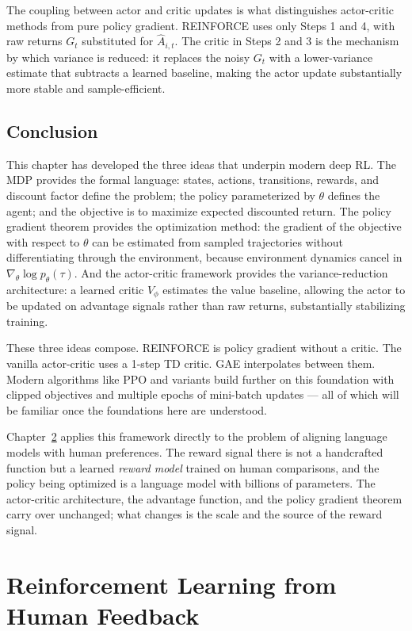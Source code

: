 \documentclass{book}
\begin{document}
The coupling between actor and critic updates is what distinguishes
actor-critic methods from pure policy gradient. REINFORCE uses only Steps
1 and 4, with raw returns $G_t$ substituted for $\hat{A}_{i,t}$. The
critic in Steps 2 and 3 is the mechanism by which variance is reduced:
it replaces the noisy $G_t$ with a lower-variance estimate that
subtracts a learned baseline, making the actor update substantially more
stable and sample-efficient.

\section{Conclusion}
\label{sec:rl_conclusion}

This chapter has developed the three ideas that underpin modern deep RL.
The MDP provides the formal language: states, actions, transitions, rewards,
and discount factor define the problem; the policy parameterized by $\theta$
defines the agent; and the objective is to maximize expected discounted
return. The policy gradient theorem provides the optimization method: the
gradient of the objective with respect to $\theta$ can be estimated from
sampled trajectories without differentiating through the environment,
because environment dynamics cancel in $\nabla_\theta \log p_\theta(\tau)$.
And the actor-critic framework provides the variance-reduction architecture:
a learned critic $V_\phi$ estimates the value baseline, allowing the actor
to be updated on advantage signals rather than raw returns, substantially
stabilizing training.

These three ideas compose. REINFORCE is policy gradient without a critic.
The vanilla actor-critic uses a 1-step TD critic. GAE interpolates between
them. Modern algorithms like PPO and variants build further on this
foundation with clipped objectives and multiple epochs of mini-batch
updates --- all of which will be familiar once the foundations here are
understood.

Chapter~\ref{ch:rlhf} applies this framework directly to the problem of
aligning language models with human preferences. The reward signal there
is not a handcrafted function but a learned \emph{reward model} trained
on human comparisons, and the policy being optimized is a language model
with billions of parameters. The actor-critic architecture, the advantage
function, and the policy gradient theorem carry over unchanged; what
changes is the scale and the source of the reward signal.

\chapter{Reinforcement Learning from Human Feedback}
\label{ch:rlhf}
\end{document}

